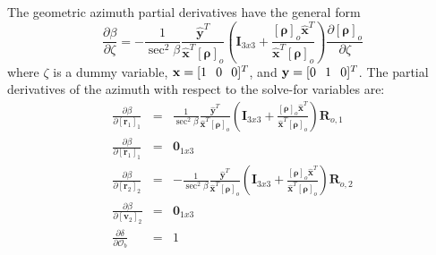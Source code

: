 The geometric azimuth partial derivatives have the general form
%
\begin{equation}
    \frac{\partial \beta}{\partial \zeta} = -\frac{1}{\sec^2{\beta}}\frac{\hat{\mathbf{y}}^T}{\hat{\mathbf{x}}^T\left[\boldsymbol{\rho}\right]_o }
    \left(\mathbf{I}_{3x3} + \frac{\left[\boldsymbol{\rho}\right]_o
    \hat{\mathbf{x}}^T}{\hat{\mathbf{x}}^T\left[\boldsymbol{\rho}\right]_o } \right)\frac{\partial \left[\boldsymbol{\rho}\right]_o }{\partial \zeta}
\end{equation}
%
where $\zeta$ is a dummy variable, $\mathbf{x} = [1 \hspace{.1 in} 0
\hspace{0.1 in} 0]^T$, and $\mathbf{y} = [0 \hspace{.1 in} 1
\hspace{0.1 in} 0]^T$.  The partial derivatives of the azimuth with
respect to the solve-for variables are:
%
\begin{eqnarray}
    \frac{\partial \beta}{\partial \left[ \mathbf{r}_1 \right]_{1}} & = &
    \frac{1}{\sec^2{\beta}}\frac{\hat{\mathbf{y}}^T}{\hat{\mathbf{x}}^T\left[\boldsymbol{\rho}\right]_o }
    \left(\mathbf{I}_{3x3} + \frac{\left[\boldsymbol{\rho}\right]_o
    \hat{\mathbf{x}}^T}{\hat{\mathbf{x}}^T\left[\boldsymbol{\rho}\right]_o } \right)\mathbf{R}_{o,1}  \\
    \frac{\partial \beta}{\partial \left[ \dot{\mathbf{r}}_1 \right]_{1}} & = & \mathbf{0}_{1x3} \\
    \frac{\partial \beta}{\partial \left[ \mathbf{r}_2 \right]_{2}} & = &
     - \frac{1}{\sec^2{\beta}}\frac{\hat{\mathbf{y}}^T}{\hat{\mathbf{x}}^T\left[\boldsymbol{\rho}\right]_o }
    \left(\mathbf{I}_{3x3} + \frac{\left[\boldsymbol{\rho}\right]_o
    \hat{\mathbf{x}}^T}{\hat{\mathbf{x}}^T\left[\boldsymbol{\rho}\right]_o } \right)\mathbf{R}_{o,2}\\
    \frac{\partial \beta}{\partial \left[ \mathbf{v}_2 \right]_{2}} & = & \mathbf{0}_{1x3}\\
    \frac{\partial \delta}{\partial  \mathcal{O}_b } & = & 1
\end{eqnarray}
%
